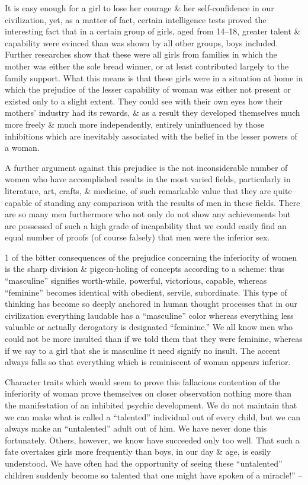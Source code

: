 \documentclass{article}
\begin{document}
It is easy enough for a girl to lose her courage \& her self-confidence in our civilization, yet, as a matter of fact, certain intelligence tests proved the interesting fact that in a certain group of girls, aged from 14--18, greater talent \& capability were evinced than was shown by all other groups, boys included. Further researches show that these were all girls from families in which the mother was either the sole bread winner, or at least contributed largely to the family support. What this means is that these girls were in a situation at home in which the prejudice of the lesser capability of woman was either not present or existed only to a slight extent. They could see with their own eyes how their mothers' industry had its rewards, \& as a result they developed themselves much more freely \& much more independently, entirely uninfluenced by those inhibitions which are inevitably associated with the belief in the lesser powers of a woman.

A further argument against this prejudice is the not inconsiderable number of women who have accomplished results in the most varied fields, particularly in literature, art, crafts, \& medicine, of such remarkable value that they are quite capable of standing any comparison with the results of men in these fields. There are so many men furthermore who not only do not show any achievements but are possessed of such a high grade of incapability that we could easily find an equal number of proofs (of course falsely) that men were the inferior sex.

1 of the bitter consequences of the prejudice concerning the inferiority of women is the sharp division \& pigeon-holing of concepts according to a scheme: thus ``masculine'' signifies worth-while, powerful, victorious, capable, whereas ``feminine'' becomes identical with obedient, servile, subordinate. This type of thinking has become so deeply anchored in human thought processes that in our civilization everything laudable has a ``masculine'' color whereas everything less valuable or actually derogatory is designated ``feminine.'' We all know men who could not be more insulted than if we told them that they were feminine, whereas if we say to a girl that she is masculine it need signify no insult. The accent always falls so that everything which is reminiscent of woman appears inferior.

Character traits which would seem to prove this fallacious contention of the inferiority of woman prove themselves on closer observation nothing more than the manifestation of an inhibited psychic development. We do not maintain that we can make what is called a ``talented'' individual out of every child, but we can always make an ``untalented'' adult out of him. We have never done this fortunately. Others, however, we know have succeeded only too well. That such a fate overtakes girls more frequently than boys, in our day \& age, is easily understood. We have often had the opportunity of seeing these ``untalented'' children suddenly become so talented that one might have spoken of a miracle!'' -- \cite[pp. 129--133]{Adler_human_nature}
\end{document}
